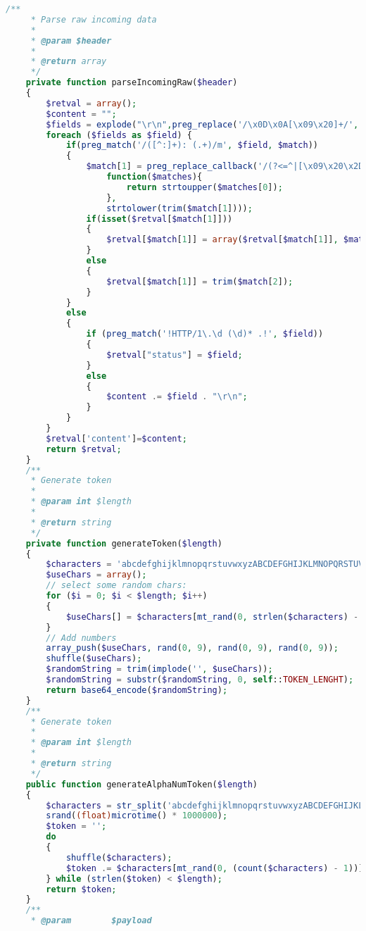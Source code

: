\begin{lstlisting}[language=PHP]
    /**
     * Parse raw incoming data
     *
     * @param $header
     *
     * @return array
     */
    private function parseIncomingRaw($header)
    {
        $retval = array();
        $content = "";
        $fields = explode("\r\n",preg_replace('/\x0D\x0A[\x09\x20]+/', ' ',$header));
        foreach ($fields as $field) {
            if(preg_match('/([^:]+): (.+)/m', $field, $match))
            {
                $match[1] = preg_replace_callback('/(?<=^|[\x09\x20\x2D])./',
                    function($matches){
                        return strtoupper($matches[0]);
                    },
                    strtolower(trim($match[1])));
                if(isset($retval[$match[1]]))
                {
                    $retval[$match[1]] = array($retval[$match[1]], $match[2]);
                }
                else
                {
                    $retval[$match[1]] = trim($match[2]);
                }
            }
            else
            {
                if (preg_match('!HTTP/1\.\d (\d)* .!', $field))
                {
                    $retval["status"] = $field;
                }
                else
                {
                    $content .= $field . "\r\n";
                }
            }
        }
        $retval['content']=$content;
        return $retval;
    }
    /**
     * Generate token
     *
     * @param int $length
     *
     * @return string
     */
    private function generateToken($length)
    {
        $characters = 'abcdefghijklmnopqrstuvwxyzABCDEFGHIJKLMNOPQRSTUVWXYZ!"§$%&/()=[]{}';
        $useChars = array();
        // select some random chars:
        for ($i = 0; $i < $length; $i++)
        {
            $useChars[] = $characters[mt_rand(0, strlen($characters) - 1)];
        }
        // Add numbers
        array_push($useChars, rand(0, 9), rand(0, 9), rand(0, 9));
        shuffle($useChars);
        $randomString = trim(implode('', $useChars));
        $randomString = substr($randomString, 0, self::TOKEN_LENGHT);
        return base64_encode($randomString);
    }
    /**
     * Generate token
     *
     * @param int $length
     *
     * @return string
     */
    public function generateAlphaNumToken($length)
    {
        $characters = str_split('abcdefghijklmnopqrstuvwxyzABCDEFGHIJKLMNOPQRSTUVWXYZ0123456789');
        srand((float)microtime() * 1000000);
        $token = '';
        do
        {
            shuffle($characters);
            $token .= $characters[mt_rand(0, (count($characters) - 1))];
        } while (strlen($token) < $length);
        return $token;
    }
    /**
     * @param        $payload

\end{lstlisting}

